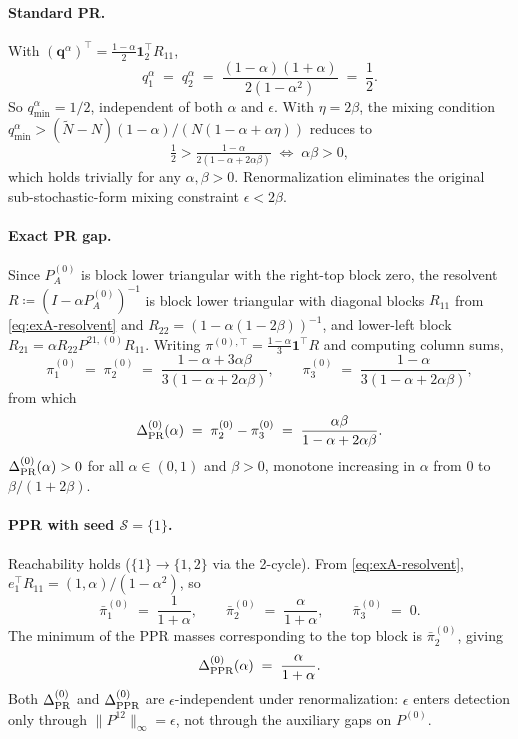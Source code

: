 \documentclass{article}
\theoremstyle{plain}
\theoremstyle{definition}
\def\tp{\intercal}
\newcommand{\arXivtag}[1][]{#1}
\begin{document}
\paragraph{Standard PR.} With $(\mathbf{q}^{\alpha})^\tp = \tfrac{1-\alpha}{2}\mathbf{1}_2^\tp R_{11}$,
	\[
	q_1^\alpha \;=\; q_2^\alpha \;=\; \frac{(1-\alpha)(1+\alpha)}{2(1-\alpha^2)} \;=\; \frac{1}{2}.
	\]
	So $q_{\min}^\alpha = 1/2$, independent of both $\alpha$ and $\epsilon$. With $\eta = 2\beta$, the mixing condition $q_{\min}^\alpha > (\tilde N - N)(1-\alpha)/(N(1-\alpha+\alpha\eta))$ reduces to
	\begin{equation}\label{eq:exA-mixing}
		\tfrac{1}{2} > \tfrac{1-\alpha}{2(1-\alpha+2\alpha\beta)} \;\Longleftrightarrow\; \alpha\beta > 0,
	\end{equation}
	which holds trivially for any $\alpha, \beta > 0$. Renormalization eliminates the original sub-stochastic-form mixing constraint $\epsilon < 2\beta$.

\paragraph{Exact PR gap.} Since $P^{(0)}_A$ is block lower triangular with the right-top block zero, the resolvent $R \coloneqq (I-\alpha P^{(0)}_A)^{-1}$ is block lower triangular with diagonal blocks $R_{11}$ from \eqref{eq:exA-resolvent} and $R_{22} = (1-\alpha(1-2\beta))^{-1}$, and lower-left block $R_{21} = \alpha R_{22}P^{21,(0)}R_{11}$. Writing ${\pi}^{(0),\tp} = \tfrac{1-\alpha}{3}\mathbf{1}^\tp R$ and computing column sums,
	\[
	\pi^{(0)}_1 \;=\; \pi^{(0)}_2 \;=\; \frac{1-\alpha+3\alpha\beta}{3(1-\alpha+2\alpha\beta)}, \qquad \pi^{(0)}_3 \;=\; \frac{1-\alpha}{3(1-\alpha+2\alpha\beta)},
	\]
	from which
	\begin{equation}\label{eq:exA-PR-gap}
		\Delta^{(0)}_{\textnormal{PR}}(\alpha) \;=\; \pi^{(0)}_2 - \pi^{(0)}_3 \;=\; \frac{\alpha\beta}{1-\alpha+2\alpha\beta}.
	\end{equation}
	$\Delta^{(0)}_{\textnormal{PR}}(\alpha) > 0$ for all $\alpha \in (0,1)$ and $\beta > 0$, monotone increasing in $\alpha$ from $0$ to $\beta/(1+2\beta)$.

\paragraph{PPR with seed $\mathcal{S} = \{1\}$.} Reachability holds ($\{1\} \to \{1,2\}$ via the 2-cycle). From \eqref{eq:exA-resolvent}, $e_1^\tp R_{11} = (1, \alpha)/(1-\alpha^2)$, so
	\[
	\bar\pi^{(0)}_1 \;=\; \frac{1}{1+\alpha}, \qquad \bar\pi^{(0)}_2 \;=\; \frac{\alpha}{1+\alpha}, \qquad \bar\pi^{(0)}_3 \;=\; 0.
	\]
	\arXivtag[The minimum of the PPR masses corresponding to the top block] is $\bar\pi^{(0)}_2$, giving
	\begin{equation}\label{eq:exA-PPR-gap}
		\Delta^{(0)}_{\textnormal{PPR}}(\alpha) \;=\; \frac{\alpha}{1+\alpha}.
	\end{equation}
	Both $\Delta^{(0)}_{\textnormal{PR}}$ and $\Delta^{(0)}_{\textnormal{PPR}}$ are $\epsilon$-independent under renormalization: $\epsilon$ enters detection only through $\|P^{12}\|_\infty = \epsilon$, not through the auxiliary gaps on $P^{(0)}$.
\end{document}
